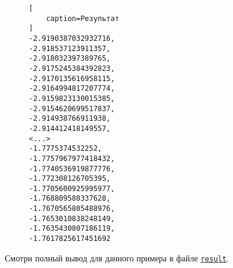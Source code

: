 \begin{figure}[H]
\begin{lstlisting}[
    caption=Результат
]
-2.9190387032932716,
-2.918537123911357,
-2.918032397389765,
-2.9175245384392823,
-2.9170135616958115,
-2.9164994817207774,
-2.9159823130015385,
-2.9154620699517837,
-2.914938766911938,
-2.914412418149557,
<...>
-1.7775374532252,
-1.7757967977418432,
-1.7740536919877776,
-1.772308126705395,
-1.7705600925995977,
-1.768809580337628,
-1.7670565805488976,
-1.7653010838248149,
-1.7635430807186119,
-1.7617825617451692
\end{lstlisting}
\end{figure}

Смотри полный вывод для данного примера в файле
\href{https://raw.githubusercontent.com/paveloom-p/P12/master/A1/result}{\footnotesize \texttt{result}}.


